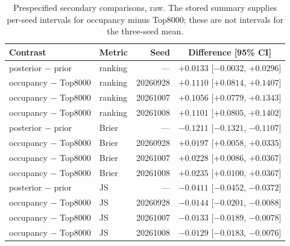 \documentclass[10pt,a4paper]{article}
\begin{document}
\begin{table}[!htbp]
\centering
\caption{Prespecified secondary comparisons, raw. The stored summary supplies per-seed intervals for occupancy minus Top8000; these are not intervals for the three-seed mean.}
\label{tab:afsecondaryraw}
\small\setlength{\tabcolsep}{4pt}
\begin{tabular}{@{}llrc@{}}
\toprule
Contrast & Metric & Seed & Difference [95\% CI] \\
\midrule
posterior $-$ prior & ranking & --- & $+0.0133$ [$-0.0032$, $+0.0296$] \\
occupancy $-$ Top8000 & ranking & 20260928 & $+0.1110$ [$+0.0814$, $+0.1407$] \\
occupancy $-$ Top8000 & ranking & 20261007 & $+0.1056$ [$+0.0779$, $+0.1343$] \\
occupancy $-$ Top8000 & ranking & 20261008 & $+0.1101$ [$+0.0805$, $+0.1402$] \\
posterior $-$ prior & Brier & --- & $-0.1211$ [$-0.1321$, $-0.1107$] \\
occupancy $-$ Top8000 & Brier & 20260928 & $+0.0197$ [$+0.0058$, $+0.0335$] \\
occupancy $-$ Top8000 & Brier & 20261007 & $+0.0228$ [$+0.0086$, $+0.0367$] \\
occupancy $-$ Top8000 & Brier & 20261008 & $+0.0235$ [$+0.0100$, $+0.0367$] \\
posterior $-$ prior & JS & --- & $-0.0411$ [$-0.0452$, $-0.0372$] \\
occupancy $-$ Top8000 & JS & 20260928 & $-0.0144$ [$-0.0201$, $-0.0088$] \\
occupancy $-$ Top8000 & JS & 20261007 & $-0.0133$ [$-0.0189$, $-0.0078$] \\
occupancy $-$ Top8000 & JS & 20261008 & $-0.0129$ [$-0.0183$, $-0.0076$] \\
\bottomrule
\end{tabular}
\end{table}
\end{document}
